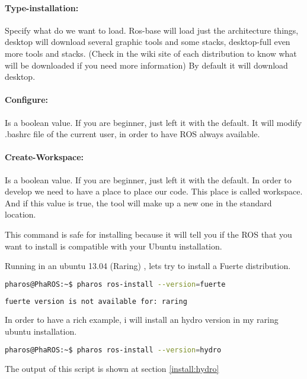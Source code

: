 \documentclass[a4paper,10pt,twoside]{book}
\begin{document}
\paragraph{Type-installation:} Specify what do we want to load. Ros-base will load just the architecture things, desktop will download several graphic tools and some stacks, desktop-full even more tools and stacks. (Check in the wiki site of each distribution to know what will be downloaded if you need more information) By default it will download desktop. 

\paragraph{Configure:}Is a boolean value. If you are beginner, just left it with the default. It will modify .bashrc file of the current user, in order to have ROS always available. 
\paragraph{Create-Workspace:} Is a boolean value.  If you are beginner, just left it with the default. In order to develop we need to have a place to place our code. This place is called workspace. And if this value is true, the tool will make up a new one in the standard location.


This command is safe for installing because it will tell you if the ROS that you want to install is compatible with your Ubuntu installation.

Running in an ubuntu 13.04 (Raring) , lets try to install a Fuerte distribution.

\begin{lstlisting}[language=bash,title={\installationTool{} Installing incompatible version}]
pharos@PhaROS:~$ pharos ros-install --version=fuerte
\end{lstlisting}

\begin{lstlisting}[language=bash,title={\installationTool{} Installing incompatible version - Output}]
fuerte version is not available for: raring
\end{lstlisting}


In order to have a rich example, i will install an hydro version in my raring ubuntu installation. 


\begin{lstlisting}[language=bash,title={\installationTool{} Installing Hydro in Ubuntu: Raring}]
pharos@PhaROS:~$ pharos ros-install --version=hydro
\end{lstlisting}

The output of this script is shown at section \autoref{install:hydro}





\ifx\wholebook\relax\else
\end{document}
